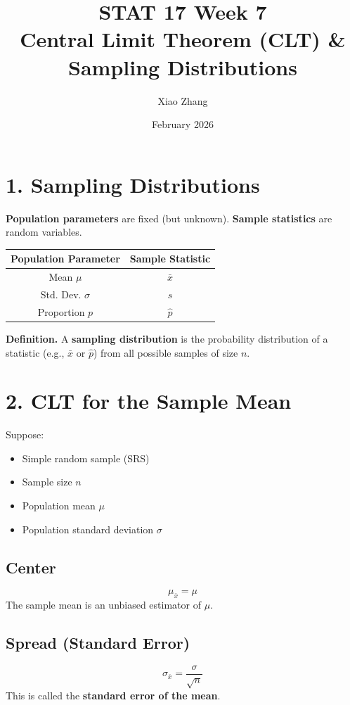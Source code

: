 \documentclass{article}
\title{STAT 17 Week 7 \\Central Limit Theorem (CLT) \& Sampling Distributions}
\author{Xiao Zhang}
\date{February 2026}
\begin{document}
\maketitle

\section*{1. Sampling Distributions}

\textbf{Population parameters} are fixed (but unknown).  
\textbf{Sample statistics} are random variables.

\begin{center}
\begin{tabular}{c|c}
\textbf{Population Parameter} & \textbf{Sample Statistic} \\ \hline
Mean $\mu$ & $\bar{x}$ \\
Std. Dev. $\sigma$ & $s$ \\
Proportion $p$ & $\hat{p}$ \\
\end{tabular}
\end{center}

\textbf{Definition.}  
A \textbf{sampling distribution} is the probability distribution of a statistic
(e.g., $\bar{x}$ or $\hat{p}$) from all possible samples of size $n$.

\bigskip

\section*{2. CLT for the Sample Mean}

Suppose:
\begin{itemize}[leftmargin=1.2cm]
\item Simple random sample (SRS)
\item Sample size $n$
\item Population mean $\mu$
\item Population standard deviation $\sigma$
\end{itemize}

\subsection*{Center}
\[
\mu_{\bar{x}} = \mu
\]
The sample mean is an unbiased estimator of $\mu$.

\subsection*{Spread (Standard Error)}
\[
\sigma_{\bar{x}} = \frac{\sigma}{\sqrt{n}}
\]
This is called the \textbf{standard error of the mean}.
\end{document}
